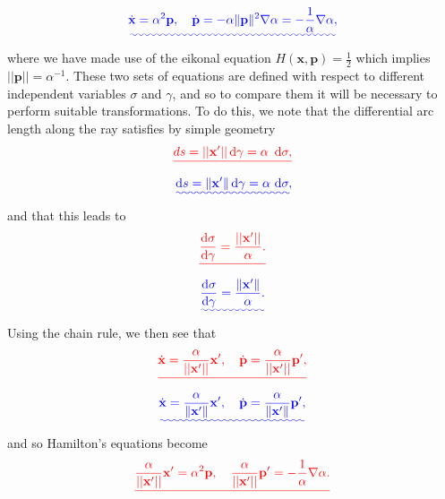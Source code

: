 \documentclass[a4paper,10pt]{paper}
\providecommand{\DIFadd}[1]{{\protect\color{blue}\uwave{#1}}} %
\providecommand{\DIFdel}[1]{{\protect\color{red}\sout{#1}}}                      %
\providecommand{\DIFaddbegin}{} %
\providecommand{\DIFaddend}{} %
\providecommand{\DIFdelbegin}{} %
\providecommand{\DIFdelend}{} %
\begin{document}
\begin{enumerate}
\begin{equation*}
    \DIFadd{\dot{\mathbf{x}}=\alpha^{2}\mathbf{p}, \quad \dot{\mathbf{p}}=-\alpha\|\mathbf{p}\|^{2}\nabla\alpha = -\frac{1}{\alpha}\nabla\alpha,
}\end{equation*}\DIFaddend 
where we have made use of the eikonal equation $H(\mathbf{x},\mathbf{p})=\frac{1}{2}$ which implies \DIFdelbegin \DIFdel{$||\mathbf{p}||=\alpha^{-1}$}\DIFdelend \DIFaddbegin \DIFadd{$\|\mathbf{p}\|=\alpha^{-1}$}\DIFaddend . These two sets of equations are defined with respect to different independent variables $\sigma$ and $\gamma$, and so to compare them it will be necessary to perform suitable transformations. To do this, we note that the differential arc length along the ray satisfies by simple geometry
\DIFdelbegin \begin{displaymath}
    \DIFdel{ds=||\mathbf{x}'||\dd\gamma=\alpha~\dd\sigma,
}\end{displaymath}%
\DIFdelend \DIFaddbegin \begin{equation*}
    \DIFadd{\dd s=\|\mathbf{x}'\|\dd\gamma=\alpha\,\dd\sigma,
}\end{equation*}\DIFaddend 
and that this leads to
\DIFdelbegin \begin{displaymath}
    \DIFdel{\frac{\ddns\sigma}{\ddns\gamma}=\frac{||\mathbf{x}'||}{\alpha}.
}\end{displaymath}%
\DIFdelend \DIFaddbegin \begin{equation*}
    \DIFadd{\frac{\ddns\sigma}{\ddns\gamma}=\frac{\|\mathbf{x}'\|}{\alpha}.
}\end{equation*}\DIFaddend 
Using the chain rule, we then see that
\DIFdelbegin \begin{displaymath}
    \DIFdel{\dot{\mathbf{x}}=\frac{\alpha}{||\mathbf{x}'||}\mathbf{x}', \quad \dot{\mathbf{p}}=\frac{\alpha}{||\mathbf{x}'||}\mathbf{p}',
}\end{displaymath}%
\DIFdelend \DIFaddbegin \begin{equation*}
    \DIFadd{\dot{\mathbf{x}}=\frac{\alpha}{\|\mathbf{x}'\|}\mathbf{x}', \quad \dot{\mathbf{p}}=\frac{\alpha}{\|\mathbf{x}'\|}\mathbf{p}',
}\end{equation*}\DIFaddend 
and so Hamilton's equations become
\DIFdelbegin \begin{displaymath}
    \DIFdel{\frac{\alpha}{||\mathbf{x}'||}\mathbf{x}'=\alpha^{2}\mathbf{p}, \quad \frac{\alpha}{||\mathbf{x}'||}\mathbf{p}'=-\frac{1}{\alpha}\nabla\alpha.
}\end{displaymath}%
\DIFdelend \DIFaddbegin \begin{equation*}

\end{equation*}
\end{enumerate}
\end{document}
